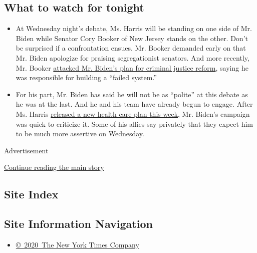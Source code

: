 \hypertarget{what-to-watch-for-tonight}{%
\subsection{What to watch for tonight}\label{what-to-watch-for-tonight}}

\begin{itemize}
\item
  At Wednesday night's debate, Ms. Harris will be standing on one side
  of Mr. Biden while Senator Cory Booker of New Jersey stands on the
  other. Don't be surprised if a confrontation ensues. Mr. Booker
  demanded early on that Mr. Biden apologize for praising segregationist
  senators. And more recently, Mr. Booker
  \href{https://www.nytimes.com/2019/07/23/us/politics/biden-criminal-justice.html}{attacked
  Mr. Biden's plan for criminal justice reform}, saying he was
  responsible for building a ``failed system.''
\item
  For his part, Mr. Biden has said he will not be as ``polite'' at this
  debate as he was at the last. And he and his team have already begun
  to engage. After Ms. Harris
  \href{https://www.nytimes.com/2019/07/29/us/politics/kamala-harris-medicare-for-all.html}{released
  a new health care plan this week}, Mr. Biden's campaign was quick to
  criticize it. Some of his allies say privately that they expect him to
  be much more assertive on Wednesday.
\end{itemize}

Advertisement

\protect\hyperlink{after-bottom}{Continue reading the main story}

\hypertarget{site-index}{%
\subsection{Site Index}\label{site-index}}

\hypertarget{site-information-navigation}{%
\subsection{Site Information
Navigation}\label{site-information-navigation}}

\begin{itemize}
\tightlist
\item
  \href{https://help.nytimes.com/hc/en-us/articles/115014792127-Copyright-notice}{©~2020~The
  New York Times Company}
\end{itemize}

